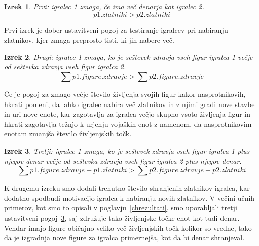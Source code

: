 \documentclass[a4paper, 12pt]{book}
\newtheorem{izrek}{Izrek}[chapter]
\begin{document}
{\begin{izrek}
	\label{ustavitvenipogoj1}
Prvi: igralec 1 zmaga, če ima več denarja kot igralec 2.
	\begin{equation}
p1.zlatniki > p2.zlatniki
	\label{eq:ustavitvenipogoj1}
	\end{equation}
\end{izrek}
\noindent
Prvi izrek je dober ustavitveni pogoj za testiranje igralcev pri nabiranju zlatnikov, kjer zmaga preprosto tisti, ki jih nabere več.

\begin{izrek}
	\label{ustavitvenipogoj2}
Drugi: igralec 1 zmaga, ko je seštevek zdravja vseh figur igralca 1 večje od seštevka zdravja vseh figur igralca 2.
	\begin{equation}
	\sum{p1.figure.zdravje} > \sum{p2.figure.zdravje}
	\label{eq:ustavitvenipogoj2}
	\end{equation}
\end{izrek}
\noindent
Če je pogoj za zmago večje število življenja svojih figur kakor nasprotnikovih, hkrati pomeni, da lahko igralec nabira več zlatnikov in z njimi gradi nove stavbe in uri nove enote, kar zagotavlja za igralca večjo skupno vsoto življenja figur in hkrati zagotavlja težnjo k urjenju vojaških enot z namenom, da nasprotnikovim enotam zmanjša število življenjskih točk.

\begin{izrek}
	\label{ustavitvenipogoj3}
Tretji: igralec 1 zmaga, ko je seštevek zdravja vseh figur igralca 1 plus njegov denar večje od seštevka zdravja vseh figur igralca 2 plus njegov denar.
	\begin{equation}
	\sum{p1.figure.zdravje} + p1.zlatniki > \sum{p2.figure.zdravje} + p2.zlatniki
	\label{eq:ustavitvenipogoj3}
	\end{equation}
\end{izrek}
\noindent
K drugemu izreku smo dodali trenutno število shranjenih zlatnikov igralca, kar dodatno spodbudi motivacijo igralca k nabiranju novih zlatnikov.
V večini učnih primerov, kot smo to opisali v poglavju~\ref{chrezultati}, smo uporabljali tretji ustavitveni pogoj~\ref{ustavitvenipogoj3}, saj združuje tako življenjske točke enot kot tudi denar.
Vendar imajo figure običajno veliko več življenjskih točk kolikor so vredne, tako da je izgradnja nove figure za igralca primernejša, kot da bi denar shranjeval.


}
\end{document}
